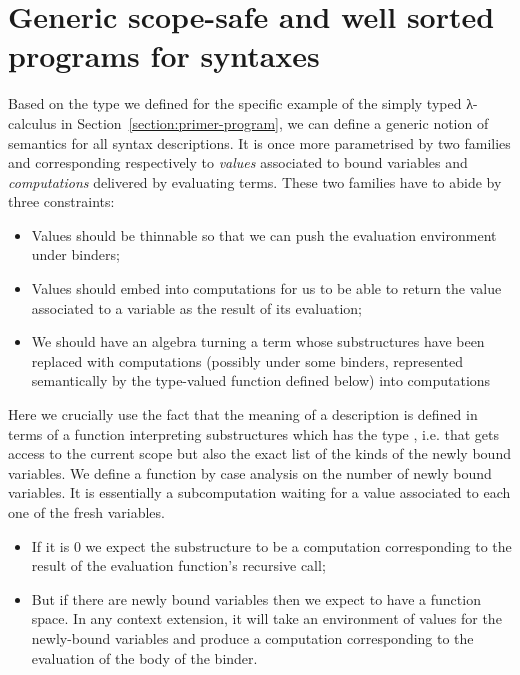 

\section{Generic scope-safe and well sorted programs for syntaxes}\label{section:semantics}

Based on the \semrec{} type we defined for the specific example of the
simply typed λ-calculus in Section~\ref{section:primer-program},
we can define a generic notion of
semantics for all syntax descriptions. It is once more parametrised
by two  families  and  corresponding
respectively to \emph{values} associated to bound variables and
\emph{computations} delivered by evaluating terms. These two families
have to abide by three constraints:
\begin{itemize}
\item{} Values should be thinnable so that we can push the
      evaluation environment under binders;
\item{} Values should embed into computations for us to be able
      to return the value associated to a variable as the
      result of its evaluation;
\item{} We should have an algebra turning
      a term whose substructures have been replaced with
      computations (possibly under some binders, represented semantically
      by the  type-valued function defined below) into computations
\end{itemize}

\begin{center}
\end{center}

Here we crucially use the fact that the meaning of a description is
defined in terms of a function interpreting substructures which has
the type    , i.e. that gets access
to the current scope but also the exact list of the kinds of the newly bound variables.
We define a function  by case analysis on the number of newly bound
variables. It is essentially a subcomputation waiting for a value associated to
each one of the fresh variables.
\begin{itemize}
\item If it is $0$ we expect the substructure to be a computation corresponding
    to the result of the evaluation function's recursive call;
  \item But if there are newly bound variables then we expect to have a function
    space. In any context extension, it will take an environment of values for
    the newly-bound variables and produce a computation corresponding to the
    evaluation of the body of the binder.
\end{itemize}

